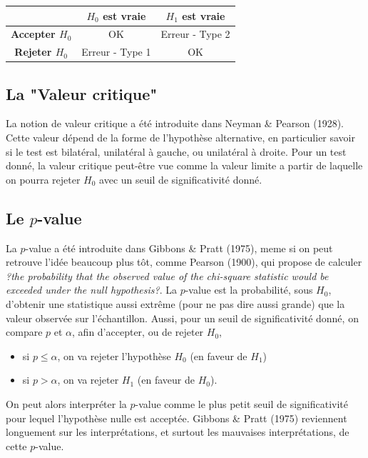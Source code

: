 \begin{center}
\begin{tabular}{c|c|c|}
\cline{2-3}
                                                & \textbf{$H_{0}$ est vraie} & \textbf{$H_{1}$ est vraie} \\ \hline
\multicolumn{1}{|c|}{\textbf{Accepter $H_{0}$}} & OK                         & Erreur - Type 2            \\ \hline
\multicolumn{1}{|c|}{\textbf{Rejeter $H_{0}$}}  & Erreur - Type 1            & OK                         \\ \hline
\end{tabular}
\end{center}

\subsection*{La "Valeur critique"}

La notion de valeur critique a été introduite dans Neyman \& Pearson (1928). Cette valeur dépend de la forme de l'hypothèse alternative, en particulier savoir si le test est bilatéral, unilatéral à gauche, ou unilatéral à droite. Pour un test donné, la valeur critique peut-être vue comme la valeur limite a partir de laquelle on pourra rejeter $H_{0}$ avec un seuil de significativité donné.

\subsection*{Le $p$-value}

La $p$-value a été introduite dans Gibbons \& Pratt (1975), meme si on peut retrouve l'idée beaucoup plus tôt, comme Pearson (1900), qui propose de calculer \textit{?the probability that the observed value of the chi-square statistic would be exceeded under the null hypothesis?}. La $p$-value est la probabilité, sous $H_{0}$, d'obtenir une statistique aussi extrême (pour ne pas dire aussi grande) que la valeur observée sur l'échantillon. Aussi, pour un seuil de significativité  donné, on compare $p$ et $\alpha$, afin d'accepter, ou de rejeter $H_{0}$,
\begin{itemize}
\item si $p \leq \alpha$, on va rejeter l'hypothèse $H_{0}$ (en faveur de $H_{1}$)
\item si $p > \alpha$, on va rejeter $H_{1}$ (en faveur de $H_{0}$).
\end{itemize}
On peut alors interpréter la $p$-value comme le plus petit seuil de significativité pour lequel l'hypothèse nulle est acceptée. Gibbons \& Pratt (1975) reviennent longuement sur les interprétations, et surtout les mauvaises interprétations, de cette $p$-value.

